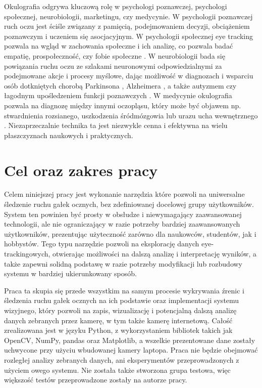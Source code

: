 \documentclass[a4paper,twoside,12pt]{book}
\begin{document}
Okulografia odgrywa kluczową rolę w psychologi poznawczej, psychologi społecznej, neurobiologii, marketingu, czy medycynie. W psychologii poznawczej ruch oczu jest ściśle związany z pamięcią, podejmowaniem decyzji, obciążeniem poznawczym i uczeniem się asocjacyjnym. W psychologii społecznej eye tracking pozwala na wgląd w zachowania społeczne i ich analizę, co pozwala badać empatię, prospołeczność, czy fobie społeczne \cite{bib:tobii-main}. W neurobiologii bada się powiązania ruchu oczu ze szlakami neuronowymi odpowiedzialnymi za podejmowane akcje i procesy myślowe, dając możliwość w diagnozach i wsparciu osób dotkniętych chorobą Parkinsona \cite{bib:tobii-parkinson}, Alzheimera \cite{bib:tobii-alzheimer}, a także autyzmem czy łagodnym upośledzeniem funkcji poznawczych \cite{bib:tobii-autyzm}. W medycynie okulografia pozwala na diagnozę między innymi oczopląsu, który może być objawem np. stwardnienia rozsianego, uszkodzenia śródmózgowia lub urazu ucha wewnętrznego \cite{bib:Diagnostyka-oczoplas}. Niezaprzeczalnie technika ta jest niezwykle cenna i efektywna na wielu płaszczyznach naukowych i praktycznych.

\section{Cel oraz zakres pracy}
\label{sec:cel-oraz-zakres-pracy}
Celem niniejszej pracy jest wykonanie narzędzia które pozwoli na uniwersalne śledzenie ruchu gałek ocznych, bez zdefiniowanej docelowej grupy użytkowników. System ten powinien być prosty w obsłudze i niewymagający zaawansowanej technologii, ale nie ograniczający w razie potrzeby bardziej zaawansowanych użytkowników, prezentując użyteczność zarówno dla naukowców, studentów, jak i hobbystów. Tego typu narzędzie pozwoli na eksplorację danych eye-trackingowych, otwierając możliwości na dalszą analizę i interpretację wyników, a także zapewni solidną podstawę w razie potrzeby modyfikacji lub rozbudowy systemu w bardziej ukierunkowany sposób.

Praca ta skupia się przede wszystkim na samym procesie wykrywania źrenic i śledzenia ruchu gałek ocznych na ich podstawie oraz implementacji systemu wizyjnego, który pozwoli na zapis, wizualizację i potencjalną dalszą analizę danych zebranych przez kamerę, w tym także kamerę internetową. Całość zrealizowana jest w języku Python, z wykorzystaniem bibliotek takich jak OpenCV, NumPy, pandas oraz Matplotlib, a wszelkie prezentowane dane zostały uchwycone przy użyciu wbudowanej kamery laptopa. Praca nie będzie obejmować rozległej analizy zebranych danych, ani eksperymentów przeprowadzonych z użyciem owego systemu. Nie została także stworzona grupa testowa, więc większość testów przeprowadzone zostały na autorze pracy.
\end{document}
